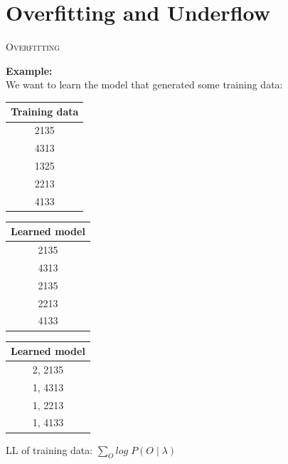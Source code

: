 \section{Overfitting and Underflow}
\begin{frame}
\center \huge \scshape Overfitting
\end{frame}

\begin{frame}
\center
\textbf{Example:}
\\
We want to learn the model that generated some training data:\\
\begin{table}[h]
\begin{tabular}{c}
\multicolumn{1}{l}{\textbf{Training data}} \\ \hline
\multicolumn{1}{|c|}{2135}    \\ \hline
\multicolumn{1}{|c|}{4313}    \\ \hline
\multicolumn{1}{|c|}{1325}    \\ \hline
\multicolumn{1}{|c|}{2213}    \\ \hline
\multicolumn{1}{|c|}{4133}    \\ \hline
\end{tabular}
\end{table}
\end{frame}

\begin{frame}
\begin{table}[h]
\begin{tabular}{c}
\multicolumn{1}{l}{\textbf{Learned model}} \\ \hline
\multicolumn{1}{|c|}{2135}    \\ \hline
\multicolumn{1}{|c|}{4313}    \\ \hline
\multicolumn{1}{|c|}{2135}    \\ \hline
\multicolumn{1}{|c|}{2213}    \\ \hline
\multicolumn{1}{|c|}{4133}    \\ \hline
\end{tabular}
\end{table}
\end{frame}

\begin{frame}
\begin{table}[h]
\begin{tabular}{c}
\multicolumn{1}{l}{\textbf{Learned model}} \\ \hline
\multicolumn{1}{|c|}{2, 2135}    \\ \hline
\multicolumn{1}{|c|}{1, 4313}    \\ \hline
\multicolumn{1}{|c|}{1, 2213}    \\ \hline
\multicolumn{1}{|c|}{1, 4133}    \\ \hline
\end{tabular}
\end{table}
\center
LL of training data: $\sum_O log \; P(O\;|\;\lambda)$
\end{frame}

